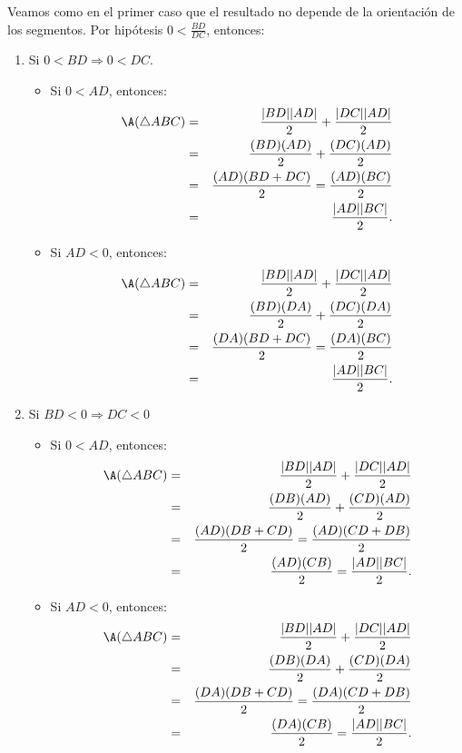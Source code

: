 \begin{pba}
\begin{enumerate}
Veamos como en el primer caso que el resultado no depende de la orientación de los segmentos. 
Por hipótesis $0< \frac{BD}{DC}$, entonces:
\begin{enumerate}
\item Si $0<BD \Rightarrow 0<DC.$
\begin{itemize}
\item Si $0<AD$, entonces:
\begin{eqnarray*}
\A(\triangle ABC)
&=&  \frac{|BD||AD|}{2} + \frac{|DC||AD|}{2}\\
&=&  \frac{(BD)(AD)}{2} + \frac{(DC)(AD)}{2}\\
&=&  \frac{(AD)(BD+DC)}{2}=\frac{(AD)(BC)}{2}\\
&=&  \frac{|AD||BC|}{2}.\\ 
\end{eqnarray*}
\item Si $AD<0$, entonces:
\begin{eqnarray*}
\A(\triangle ABC)
&=&  \frac{|BD||AD|}{2} + \frac{|DC||AD|}{2}\\
&=&  \frac{(BD)(DA)}{2} + \frac{(DC)(DA)}{2}\\
&=&  \frac{(DA)(BD+DC)}{2}=\frac{(DA)(BC)}{2}\\
&=&  \frac{|AD||BC|}{2}.\\ 
\end{eqnarray*}		
\end{itemize}		 
\item Si $BD<0 \Rightarrow DC<0$
\begin{itemize}
\item Si $0<AD$, entonces:
\begin{eqnarray*}
\A(\triangle ABC)
&=&  \frac{|BD||AD|}{2} + \frac{|DC||AD|}{2}\\
&=&  \frac{(DB)(AD)}{2} + \frac{(CD)(AD)}{2}\\
&=&  \frac{(AD)(DB+CD)}{2}=\frac{(AD)(CD+DB)}{2}\\
&=&  \frac{(AD)(CB)}{2}=\frac{|AD||BC|}{2}.\\ 
\end{eqnarray*}
\item Si $AD<0$, entonces:
\begin{eqnarray*}
\A(\triangle ABC)
&=&  \frac{|BD||AD|}{2} + \frac{|DC||AD|}{2}\\
&=&  \frac{(DB)(DA)}{2} + \frac{(CD)(DA)}{2}\\
&=&  \frac{(DA)(DB+CD)}{2}=\frac{(DA)(CD+DB)}{2}\\
&=&  \frac{(DA)(CB)}{2}=\frac{|AD||BC|}{2}.\\ 
\end{eqnarray*}		
\end{itemize}
\end{enumerate}
\end{enumerate}
	
\end{pba}



